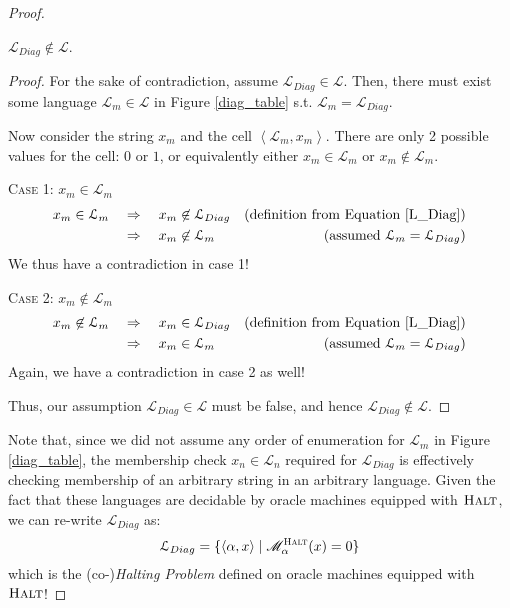 \documentclass[usletter]{article}
\newcommand {\langset}[1]      {\ensuremath{\mathcal{#1}}}
\newcommand {\machine}[1]      {\ensuremath{\mathscr{#1}}}
\newcommand {\namedlangset}[1] {\ensuremath{\textnormal{\textsc{#1}}}}
\newcommand {\term}[1]      {\textit{#1}}
\newcommand {\langL}          {\langset{L}}
\newcommand {\machineM}       {\machine{M}}
\begin{document}
\begin{enumerate}
\begin{proof}
    \begin{claim}
      $ \langL_{Diag} \not\in \langL $.
    \end{claim}
    \begin{proof}
      For the sake of contradiction, assume $\langL_{Diag} \in \langL$. Then,
      there must exist some language $\langL_m \in \langL$ in Figure
      \ref{diag_table} s.t. $\langL_m = \langL_{Diag}$.

      Now consider the string $x_m$ and the cell $\left< \langL_m, x_m \right>$.
      There are only 2 possible values for the cell: $0$ or $1$, or equivalently
      either $x_m \in \langL_m$ or $x_m \not\in \langL_m$.

      \textsc{Case 1: $x_m \in \langL_m$}
      \begin{align*}
        x_m \in \langL_m \quad &\Rightarrow \quad x_m \not\in \langL_{Diag}
            & (\textnormal{definition from Equation }\ref{L_Diag})\\
          &\Rightarrow \quad x_m \not\in \langL_m
            & (\textnormal{assumed }\langL_m = \langL_{Diag})
      \end{align*}
      We thus have a contradiction in case 1!

      \textsc{Case 2: $x_m \not\in \langL_m$}
      \begin{align*}
        x_m \not\in \langL_m \quad &\Rightarrow \quad x_m \in \langL_{Diag}
            & (\textnormal{definition from Equation }\ref{L_Diag})\\
          &\Rightarrow \quad x_m \in \langL_m
            & (\textnormal{assumed }\langL_m = \langL_{Diag})
      \end{align*}
      Again, we have a contradiction in case 2 as well!

      Thus, our assumption  $\langL_{Diag} \in \langL$ must be false, and hence
      $\langL_{Diag} \not\in \langL$.
    \end{proof}

    Note that, since we did not assume any order of enumeration for $\langL_m$
    in Figure \ref{diag_table}, the membership check $x_n \in \langL_n$ required
    for $\langL_{Diag}$ is effectively checking membership of an arbitrary
    string in an arbitrary language. Given the fact that these languages are
    decidable by oracle machines equipped with \namedlangset{Halt}, we can
    re-write $\langL_{Diag}$ as:
    $$
      \langL_{Diag} = \{ \left< \alpha , x \right> \mid
                         \machineM_\alpha^\namedlangset{Halt}(x) = 0 \}
    $$
    which is the (co-)\term{Halting Problem} defined on oracle machines equipped
    with \namedlangset{Halt}!
  \end{proof}


\end{enumerate}
\end{document}
